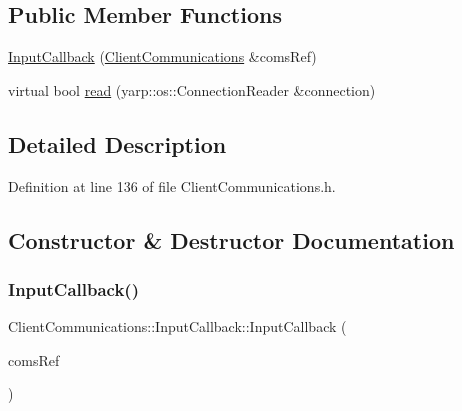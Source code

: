 \subsection*{Public Member Functions}
\begin{DoxyCompactItemize}
\item 
\hyperlink{classocra__recipes_1_1ClientCommunications_1_1InputCallback_aa5c33ecb3827af045af9b4206a0bfb31}{Input\+Callback} (\hyperlink{classocra__recipes_1_1ClientCommunications}{Client\+Communications} \&coms\+Ref)
\item 
virtual bool \hyperlink{classocra__recipes_1_1ClientCommunications_1_1InputCallback_ac35b3e10d832570b5559afd89d1a58c5}{read} (yarp\+::os\+::\+Connection\+Reader \&connection)
\end{DoxyCompactItemize}


\subsection{Detailed Description}


Definition at line 136 of file Client\+Communications.\+h.



\subsection{Constructor \& Destructor Documentation}
\hypertarget{classocra__recipes_1_1ClientCommunications_1_1InputCallback_aa5c33ecb3827af045af9b4206a0bfb31}{}\label{classocra__recipes_1_1ClientCommunications_1_1InputCallback_aa5c33ecb3827af045af9b4206a0bfb31} 
\subsubsection{\texorpdfstring{Input\+Callback()}{InputCallback()}}
{\footnotesize\ttfamily Client\+Communications\+::\+Input\+Callback\+::\+Input\+Callback (\begin{DoxyParamCaption}\item[{\hyperlink{classocra__recipes_1_1ClientCommunications}{Client\+Communications} \&}]{coms\+Ref }\end{DoxyParamCaption})}



